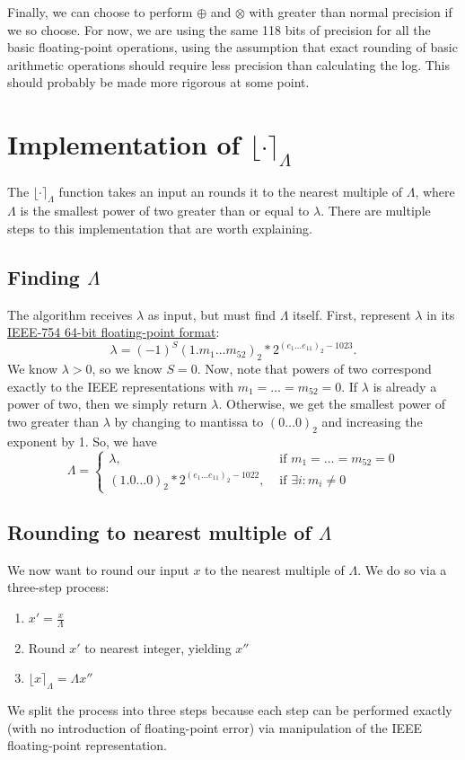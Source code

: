 \documentclass[11pt]{scrartcl} %
\begin{document}
Finally, we can choose to perform $\oplus$ and $\otimes$ with greater than normal precision if we so choose. For now, we are using the same 118 bits of precision for all the basic floating-point operations, using the assumption that exact rounding of basic arithmetic operations should require less precision than calculating the log. This should probably be made more rigorous at some point.

\section{Implementation of $\lfloor \cdot \rceil_{\Lambda}$}
The $\lfloor \cdot \rceil_{\Lambda}$ function takes an input an rounds it to the nearest multiple of $\Lambda$, where $\Lambda$ is the smallest power of two greater than or equal to $\lambda$. There are multiple steps to this implementation that are worth explaining.

\subsection{Finding $\Lambda$}
The algorithm receives $\lambda$ as input, but must find $\Lambda$ itself. First, represent $\lambda$ in its \href{https://en.wikipedia.org/wiki/Double-precision_floating-point_format}{IEEE-754 64-bit floating-point format}:
\[ \lambda = (-1)^S (1.m_{1} \hdots m_{52})_2 * 2^{(e_1 \hdots e_{11})_2-1023}. \]
We know $\lambda > 0$, so we know $S = 0$. Now, note that powers of two correspond exactly to the IEEE representations with $m_1 = \hdots = m_{52} = 0$. If $\lambda$ is already a power of two, then we simply return $\lambda$. Otherwise, we get the smallest power of two greater than $\lambda$ by changing to mantissa to $(0 \hdots 0)_2$ and increasing the exponent by 1. So, we have
\begin{equation}
    \Lambda =
        \begin{cases}
            \lambda, & \text{ if } m_1 = \hdots = m_{52} = 0 \\
            (1.0 \hdots 0)_2 * 2^{(e_1 \hdots e_{11})_2-1022}, & \text{ if } \exists i: m_i \neq 0
        \end{cases}
\end{equation}

\subsection{Rounding to nearest multiple of $\Lambda$}
We now want to round our input $x$ to the nearest multiple of $\Lambda$. We do so via a three-step process:
\begin{enumerate}
    \item $x' = \frac{x}{\Lambda}$
    \item Round $x'$ to nearest integer, yielding $x''$
    \item $\lfloor x \rceil_{\Lambda} = \Lambda x''$
\end{enumerate}
We split the process into three steps because each step can be performed exactly (with no introduction of floating-point error) via manipulation of the IEEE floating-point representation.
\end{document}
